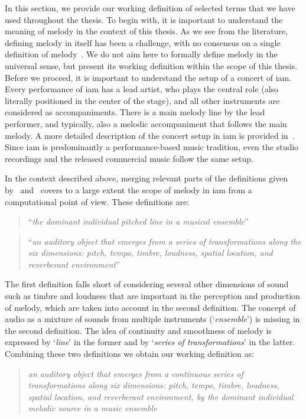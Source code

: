 In this section, we provide our working definition of selected terms that we have used throughout the thesis. To begin with, it is important to understand the meaning of melody in the context of this thesis. As we see from the literature, defining melody in itself has been a challenge, with no consensus on a single definition of melody~\citep{gomez2003melody,salamon:phd:13}. We do not aim here to formally define melody in the universal sense, but present its working definition within the scope of this thesis. Before we proceed, it is important to understand the setup of a concert of \gls{iam}. Every performance of \gls{iam} has a lead artist, who plays the central role (also literally positioned in the center of the stage), and all other instruments are considered as accompaniments. There is a main melody line by the lead performer, and typically, also a melodic accompaniment that follows the main melody. A more detailed description of the concert setup in \gls{iam} is provided in~. Since \gls{iam} is predominantly a performance-based music tradition, even the studio recordings and the released commercial music follow the same setup.

In the context described above, merging relevant parts of the definitions given by~\cite{paiva2006melody} and~\cite{levitin2002memory} covers to a large extent the scope of melody in \gls{iam} from a computational point of view. These definitions are:

\blockquote[\cite{paiva2006melody}]{``\textit{the dominant individual pitched line in a musical ensemble}''}

\blockquote[\cite{levitin2002memory}]{``\textit{an auditory object that emerges from a series of transformations along the six dimensions: pitch, tempo, timbre, loudness, spatial location, and reverberant environment}''}

The first definition falls short of considering several other dimensions of sound such as timbre and loudness that are important in the perception and production of melody, which are taken into account in the second definition. The concept of audio as a mixture of sounds from multiple instruments (`\textit{ensemble}') is missing in the second definition. The idea of continuity and smoothness of melody is expressed by `\textit{line}' in the former and by `\textit{series of transformations}' in the latter. Combining these two definitions we obtain our working definition as: 

\blockquote{\textit{an auditory object that emerges from a continuous series of transformations along six dimensions: pitch, tempo, timbre, loudness, spatial location, and reverberant environment, by the dominant individual melodic source in a music ensemble}}. 

